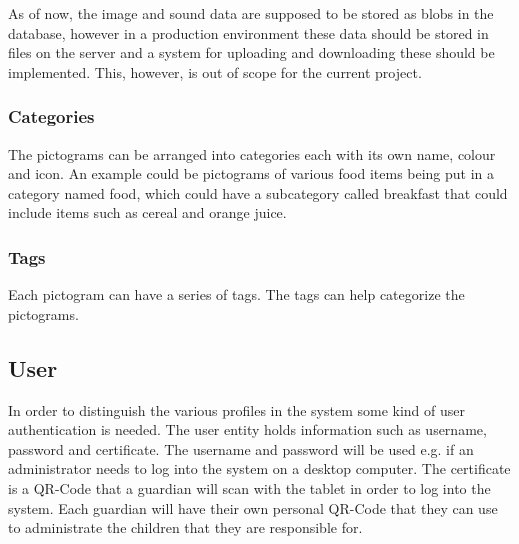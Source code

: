 As of now, the image and sound data are supposed to be stored as blobs in the database, however in a production environment these data should be stored in files on the server and a system for uploading and downloading these should be implemented. This, however, is out of scope for the current project. 

\subsubsection{Categories}
The pictograms can be arranged into categories each with its own name, colour and icon.
An example could be pictograms of various food items being put in a category named food, which could have a subcategory called breakfast that could include items such as cereal and orange juice.

\subsubsection{Tags}
Each pictogram can have a series of tags. The tags can help categorize the pictograms.

\subsection{User}
In order to distinguish the various profiles in the system some kind of user authentication is needed. The user entity holds information such as username, password and certificate.
The username and password will be used e.g. if an administrator needs to log into the system on a desktop computer. The certificate is a QR-Code that a guardian will scan with the tablet in order to log into the system. Each guardian will have their own personal QR-Code that they can use to administrate the children that they are responsible for.